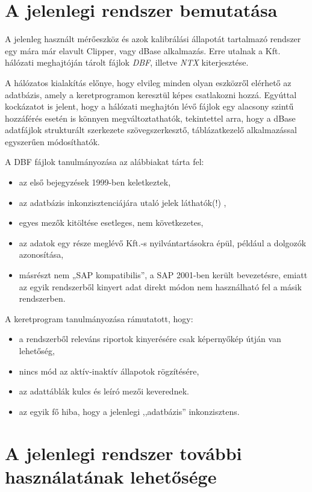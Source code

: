 \documentclass[a4paper,12pt]{report}
\begin{document}
\section{A jelenlegi rendszer bemutatása}
A jelenleg használt mérőeszköz és azok kalibrálási állapotát tartalmazó rendszer 
egy mára már elavult Clipper, vagy dBase alkalmazás. Erre utalnak a Kft.
hálózati meghajtóján tárolt fájlok \textit{DBF}, illetve \textit{NTX} 
kiterjesztése.

A hálózatos kialakítás előnye, hogy elvileg minden olyan eszközről elérhető az
adatbázis, amely a keretprogramon keresztül képes csatlakozni hozzá. Egyúttal 
kockázatot is jelent, hogy a hálózati meghajtón lévő fájlok egy alacsony szintű 
hozzáférés esetén is könnyen megváltoztathatók, tekintettel arra, hogy a dBase 
adatfájlok strukturált szerkezete szövegszerkesztő, táblázatkezelő 
alkalmazással egyszerűen módosíthatók.

A DBF fájlok tanulmányozása az alábbiakat tárta fel:
\begin{itemize}
\item az első bejegyzések 1999-ben keletkeztek,
\item az adatbázis inkonzisztenciájára utaló jelek láthatók(!) ,
\item egyes mezők kitöltése esetleges, nem következetes,
\item az adatok egy része meglévő Kft.-s nyilvántartásokra épül, például a
dolgozók azonosítása,
\item másrészt nem „SAP kompatibilis”, a SAP 2001-ben került bevezetésre, emiatt 
az egyik rendszerből kinyert adat direkt módon nem használható fel a másik 
rendszerben.
\end{itemize}
A keretprogram tanulmányozása rámutatott, hogy:
\begin{itemize}
\item a rendszerből releváns riportok kinyerésére csak képernyőkép útján van
lehetőség,
\item nincs mód az aktív-inaktív állapotok rögzítésére,
\item az adattáblák kulcs és leíró mezői keverednek.
\item az egyik fő hiba, hogy a jelenlegi ,,adatbázis'' inkonzisztens.
\end{itemize}

\section{A jelenlegi rendszer további használatának lehetősége}
\end{document}
